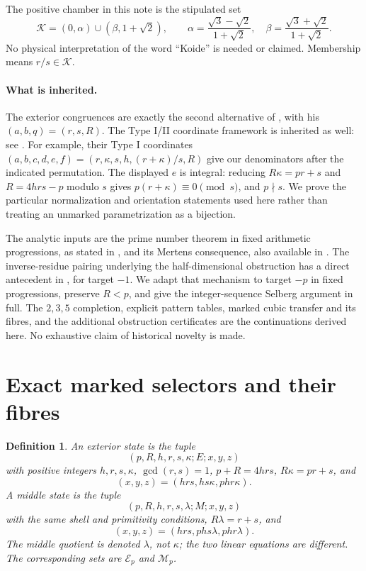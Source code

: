 \documentclass[11pt]{article}
\newtheorem{definition}[theorem]{Definition}
\theoremstyle{remark}\newtheorem{remark}[theorem]{Remark}
\newcommand{\E}{\mathcal E}
\newcommand{\M}{\mathcal M}
\begin{document}
The positive chamber in this note is the stipulated set
\begin{equation}\label{eq:chamber}
 \mathcal K=(0,\alpha)\cup(\beta,1+\sqrt2),\qquad
 \alpha=\frac{\sqrt3-\sqrt2}{1+\sqrt2},\quad
 \beta=\frac{\sqrt3+\sqrt2}{1+\sqrt2}.
\end{equation}
No physical interpretation of the word ``Koide'' is needed or claimed. Membership means $r/s\in\mathcal K$.

\paragraph{What is inherited.}
The exterior congruences are exactly the second alternative of \citet[\S1, Lemma 2, equation (4), p.~38]{Yamamoto1965}, with his $(a,b,q)=(r,s,R)$. The Type I/II coordinate framework is inherited as well: see \citet[\S2, equations (2.1)--(2.9), Propositions 2.2--2.3 and 2.6--2.7]{ElsholtzTao2013}. For example, their Type I coordinates $(a,b,c,d,e,f)=(r,\kappa,s,h,(r+\kappa)/s,R)$ give our denominators after the indicated permutation. The displayed $e$ is integral: reducing $R\kappa=pr+s$ and $R=4hrs-p$ modulo $s$ gives $p(r+\kappa)\equiv0\pmod s$, and $p\nmid s$. We prove the particular normalization and orientation statements used here rather than treating an unmarked parametrization as a bijection.

The analytic inputs are the prime number theorem in fixed arithmetic progressions, as stated in \citet[\S2, p.~2]{Rudnick2015}, and its Mertens consequence, also available in \citet[\S3, Theorem 1, p.~356]{Williams1974}. The inverse-residue pairing underlying the half-dimensional obstruction has a direct antecedent in \citet[\S4.1, Lemma 4.2 and Theorem 4.3]{Dahan2026}, for target $-1$. We adapt that mechanism to target $-p$ in fixed progressions, preserve $R<p$, and give the integer-sequence Selberg argument in full. The $2,3,5$ completion, explicit pattern tables, marked cubic transfer and its fibres, and the additional obstruction certificates are the continuations derived here. No exhaustive claim of historical novelty is made.

\section{Exact marked selectors and their fibres}\label{sec:selectors}
\begin{definition}
An exterior state is the tuple
\[
 (p,R,h,r,s,\kappa;E;x,y,z)
\]
with positive integers $h,r,s,\kappa$, $\gcd(r,s)=1$, $p+R=4hrs$, $R\kappa=pr+s$, and
\begin{equation}\label{eq:E}
 (x,y,z)=(hrs,hs\kappa,phr\kappa).
\end{equation}
A middle state is the tuple
\[
 (p,R,h,r,s,\lambda;M;x,y,z)
\]
with the same shell and primitivity conditions, $R\lambda=r+s$, and
\begin{equation}\label{eq:M}
 (x,y,z)=(hrs,phs\lambda,phr\lambda).
\end{equation}
The middle quotient is denoted $\lambda$, not $\kappa$; the two linear equations are different. The corresponding sets are $\E_p$ and $\M_p$.
\end{definition}
\end{document}
